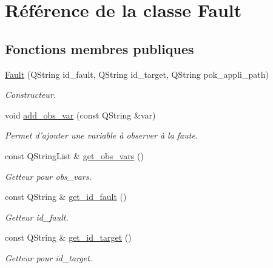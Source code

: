 \hypertarget{classFault}{
\section{Référence de la classe Fault}
\label{classFault}
}
\subsection*{Fonctions membres publiques}
\begin{DoxyCompactItemize}
\item 
\hyperlink{classFault_a57b3289565045a3fa12021493dc59004}{Fault} (QString id\_\-fault, QString id\_\-target, QString pok\_\-appli\_\-path)
\begin{DoxyCompactList}\small\item\em Constructeur. \item\end{DoxyCompactList}\item 
void \hyperlink{classFault_a14cf17c529e7b3a32ab83f7a65508cf0}{add\_\-obs\_\-var} (const QString \&var)
\begin{DoxyCompactList}\small\item\em Permet d'ajouter une variable à observer à la faute. \item\end{DoxyCompactList}\item 
const QStringList \& \hyperlink{classFault_aefee6c635192a72db5da4791a497d142}{get\_\-obs\_\-vars} ()
\begin{DoxyCompactList}\small\item\em Getteur pour obs\_\-vars. \item\end{DoxyCompactList}\item 
const QString \& \hyperlink{classFault_a1a5feabdd47460e5f9613440151a0617}{get\_\-id\_\-fault} ()
\begin{DoxyCompactList}\small\item\em Getteur id\_\-fault. \item\end{DoxyCompactList}\item 
const QString \& \hyperlink{classFault_ae3b9cb296c0c03eeddc621ef318c4ce5}{get\_\-id\_\-target} ()
\begin{DoxyCompactList}\small\item\em Getteur pour id\_\-target. \item\end{DoxyCompactList}\item 

\end{DoxyCompactItemize}
